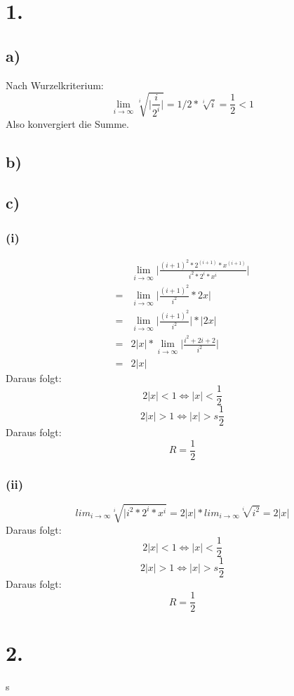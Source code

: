 \documentclass[a4paper]{scrartcl}
\title{\titleinfo}
\author{Elena Noll, Sven-Hendrik Haase, Arne Struck}
\date{\today}
\begin{document}
\maketitle
\notag

\section{1.}
\subsection{a)}
Nach Wurzelkriterium:
\[ \lim_{i\to\infty} \sqrt[i]{\bigg| \frac{i}{2^i} \bigg|} = 1/2 * \sqrt[i]{i} = \frac{1} {2} < 1 \]
Also konvergiert die Summe.

\subsection{b)}
\subsection{c)}
\subsubsection{(i)}
\begin{align}
&\lim_{i\to\infty} \bigg| \frac{(i+1)^2 * 2^{(i+1)} * x^{(i+1)}} {i^2 * 2^i * x^i} \bigg| \\
= &\lim_{i\to\infty} \bigg| \frac{(i+1)^2} {i^2} * 2x \bigg| \\
= &\lim_{i\to\infty} \bigg| \frac{(i+1)^2} {i^2} \bigg| * |2x| \\
=& 2|x| * \lim_{i\to\infty} \bigg| \frac{i^2 + 2i + 2} {i^2} \bigg| \\
=& 2|x|
\end{align}
Daraus folgt: 
\[2|x| < 1 \Leftrightarrow |x| < \frac{1}{2}\]
\[2|x| > 1 \Leftrightarrow |x| >s \frac{1}{2}\]
Daraus folgt: \\
\[R = \frac{1}{2}\]

\subsubsection{(ii)}
\[lim_{i\to\infty} \sqrt[i]{|i^2 * 2^i * x^i} = 2|x| * lim_{i\to\infty} \sqrt[i]{i^2} = 2|x|\]
Daraus folgt: 
\[2|x| < 1 \Leftrightarrow |x| < \frac{1}{2}\]
\[2|x| > 1 \Leftrightarrow |x| >s \frac{1}{2}\]
Daraus folgt: \\
\[R = \frac{1}{2}\]
\section{2.}s
\end{document}
